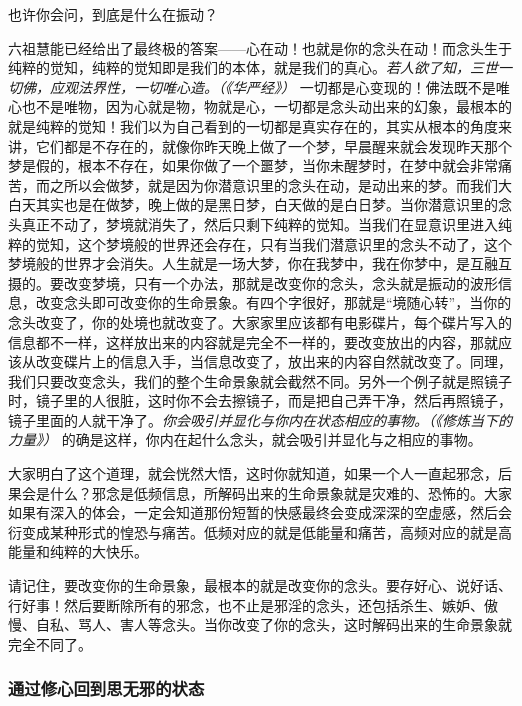 也许你会问，到底是什么在振动？

六祖慧能已经给出了最终极的答案——心在动！也就是你的念头在动！而念头生于纯粹的觉知，纯粹的觉知即是我们的本体，就是我们的真心。\textit{若人欲了知，三世一切佛，应观法界性，一切唯心造。（《华严经》）} 一切都是心变现的！佛法既不是唯心也不是唯物，因为心就是物，物就是心，一切都是念头动出来的幻象，最根本的就是纯粹的觉知！我们以为自己看到的一切都是真实存在的，其实从根本的角度来讲，它们都是不存在的，就像你昨天晚上做了一个梦，早晨醒来就会发现昨天那个梦是假的，根本不存在，如果你做了一个噩梦，当你未醒梦时，在梦中就会非常痛苦，而之所以会做梦，就是因为你潜意识里的念头在动，是动出来的梦。而我们大白天其实也是在做梦，晚上做的是黑日梦，白天做的是白日梦。当你潜意识里的念头真正不动了，梦境就消失了，然后只剩下纯粹的觉知。当我们在显意识里进入纯粹的觉知，这个梦境般的世界还会存在，只有当我们潜意识里的念头不动了，这个梦境般的世界才会消失。人生就是一场大梦，你在我梦中，我在你梦中，是互融互摄的。要改变梦境，只有一个办法，那就是改变你的念头，念头就是振动的波形信息，改变念头即可改变你的生命景象。有四个字很好，那就是“境随心转”，当你的念头改变了，你的处境也就改变了。大家家里应该都有电影碟片，每个碟片写入的信息都不一样，这样放出来的内容就是完全不一样的，要改变放出的内容，那就应该从改变碟片上的信息入手，当信息改变了，放出来的内容自然就改变了。同理，我们只要改变念头，我们的整个生命景象就会截然不同。另外一个例子就是照镜子时，镜子里的人很脏，这时你不会去擦镜子，而是把自己弄干净，然后再照镜子，镜子里面的人就干净了。\textit{你会吸引并显化与你内在状态相应的事物。（《修炼当下的力量》）} 的确是这样，你内在起什么念头，就会吸引并显化与之相应的事物。

大家明白了这个道理，就会恍然大悟，这时你就知道，如果一个人一直起邪念，后果会是什么？邪念是低频信息，所解码出来的生命景象就是灾难的、恐怖的。大家如果有深入的体会，一定会知道那份短暂的快感最终会变成深深的空虚感，然后会衍变成某种形式的惶恐与痛苦。低频对应的就是低能量和痛苦，高频对应的就是高能量和纯粹的大快乐。

请记住，要改变你的生命景象，最根本的就是改变你的念头。要存好心、说好话、行好事！然后要断除所有的邪念，也不止是邪淫的念头，还包括杀生、嫉妒、傲慢、自私、骂人、害人等念头。当你改变了你的念头，这时解码出来的生命景象就完全不同了。

\subsubsection{通过修心回到思无邪的状态}

